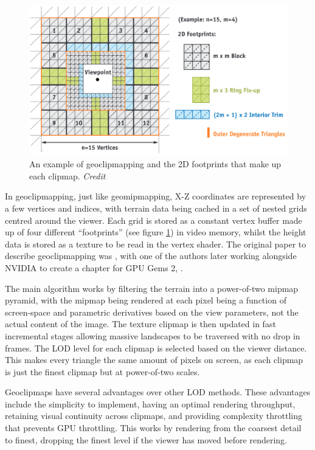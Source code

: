 \documentclass[notitlepage,12pt]{article}
\begin{document}
\begin{figure}[h]
  \centering
  \includegraphics[width=1.0\textwidth]{geoclipmapping_footprints.png}
  \caption{An example of geoclipmapping and the 2D footprints that make up each clipmap. \textit{Credit \cite{geoclipmappingGPUGems}}}
  \label{fig:geoclipmapping}
\end{figure}

In geoclipmapping, just like geomipmapping, X-Z coordinates are represented by a few vertices and indices, with terrain data being cached in a set of nested grids centred around the viewer. Each grid is stored as a constant vertex buffer made up of four different ``footprints'' (see figure \ref{fig:geoclipmapping}) in video memory, whilst the height data is stored as a texture to be read in the vertex shader. The original paper to describe geoclipmapping was \cite{geoclipmapping}, with one of the authors later working alongside NVIDIA to create a chapter for GPU Gems 2, \cite{geoclipmappingGPUGems}.

The main algorithm works by filtering the terrain into a power-of-two mipmap pyramid, with the mipmap being rendered at each pixel being a function of screen-space and parametric derivatives based on the view parameters, not the actual content of the image. The texture clipmap is then updated in fast incremental stages allowing massive landscapes to be traversed with no drop in frames. The LOD level for each clipmap is selected based on the viewer distance. This makes every triangle the same amount of pixels on screen, as each clipmap is just the finest clipmap but at power-of-two scales.

Geoclipmaps have several advantages over other LOD methods. These advantages include the simplicity to implement, having an optimal rendering throughput, retaining visual continuity across clipmaps, and providing complexity throttling that prevents GPU throttling. This works by rendering from the coarsest detail to finest, dropping the finest level if the viewer has moved before rendering.
\end{document}
